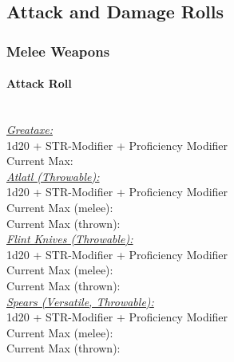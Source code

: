 \documentclass[letterpaper,openany,oneside,twocolumn]{book}
\begin{document}
\subsection*{Attack and Damage Rolls}
\subsubsection*{Melee Weapons}
\paragraph*{Attack Roll}\hfill\\
\underline{\textit{Greataxe:}}\\
1d20 + STR-Modifier + Proficiency Modifier\\
\indent Current Max: 
\\
\underline{\textit{Atlatl (Throwable):}}\\
1d20 + STR-Modifier + Proficiency Modifier\\
\indent Current Max (melee): \\
\indent Current Max (thrown): 
\\
\underline{\textit{Flint Knives (Throwable):}}\\
1d20 + STR-Modifier + Proficiency Modifier\\
\indent Current Max (melee): \\
\indent Current Max (thrown): 
\\
\underline{\textit{Spears (Versatile, Throwable):}}\\
1d20 + STR-Modifier + Proficiency Modifier\\
\indent Current Max (melee): \\
\indent Current Max (thrown): 
\end{document}
